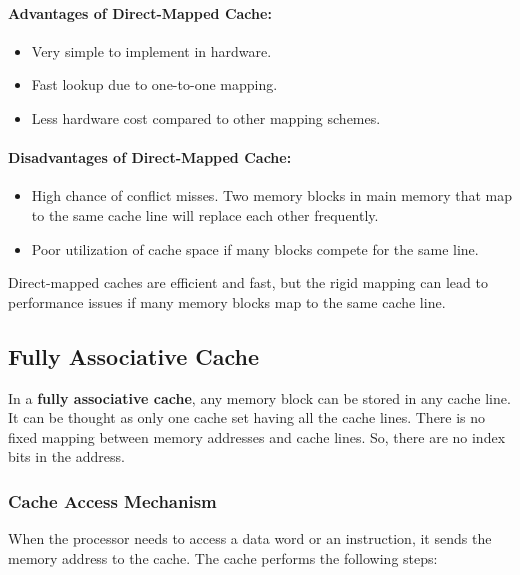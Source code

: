 \documentclass[12pt]{book}
\begin{document}
\paragraph{Advantages of Direct-Mapped Cache:}
\begin{itemize}
    \item Very simple to implement in hardware.
    \item Fast lookup due to one-to-one mapping.
    \item Less hardware cost compared to other mapping schemes.
\end{itemize}

\paragraph{Disadvantages of Direct-Mapped Cache:}
\begin{itemize}
    \item High chance of conflict misses. Two memory blocks in main memory that map to the same cache line will replace each other frequently.
    \item Poor utilization of cache space if many blocks compete for the same line.
\end{itemize}

Direct-mapped caches are efficient and fast, but the rigid mapping can lead to performance issues if many memory blocks map to the same cache line.

\subsection*{Fully Associative Cache}
\label{sec:fully-associative-cache}

In a \textbf{fully associative cache}, any memory block can be stored in any cache line. It can be thought as only one cache set having all the cache lines. There is no fixed mapping between memory addresses and cache lines. So, there are no index bits in the address.

\subsubsection*{Cache Access Mechanism}
When the processor needs to access a data word or an instruction, it sends the memory address to the cache. The cache performs the following steps:
\end{document}
